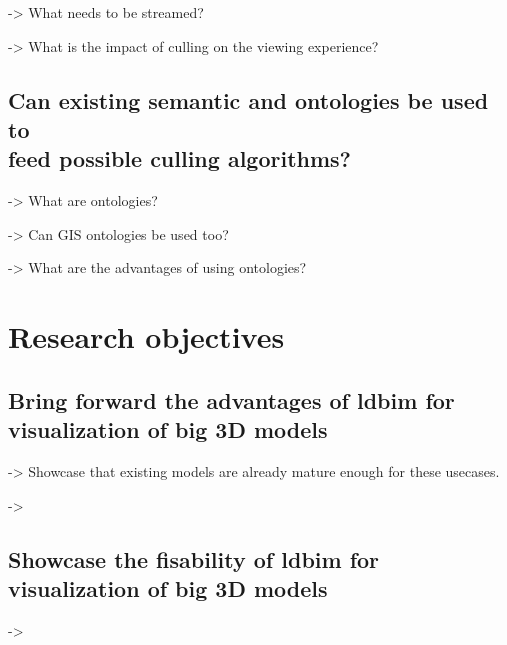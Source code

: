-> What needs to be streamed?

-> What is the impact of culling on the viewing experience?

\subsection[Can existing semantic be used?]{Can existing semantic and ontologies be used to\\
    feed possible culling algorithms?}
-> What are ontologies?

-> Can GIS ontologies be used too?

-> What are the advantages of using ontologies?

\section{Research objectives}
\subsection[Advantages of LDBIM]{Bring forward the advantages of \acs{ldbim} for visualization of big 3D models}
-> Showcase that existing models are already mature enough for these usecases.

->
\subsection[Showcase the fisability]{Showcase the fisability of \acs{ldbim} for visualization of big 3D models}
->